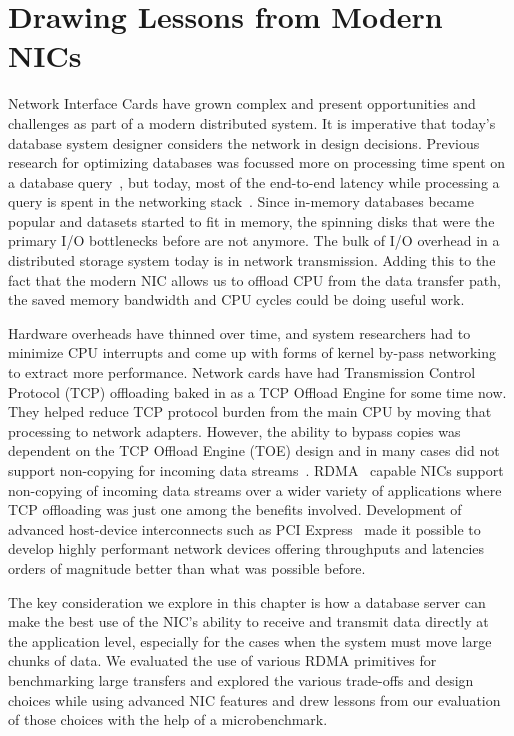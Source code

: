 \chapter{Drawing Lessons from Modern NICs}
\label{chap:modernnics}
Network Interface Cards have grown complex and present opportunities and  challenges as part of a modern distributed system.
 It is imperative that today's database system designer considers the network in design decisions. Previous research for optimizing databases was focussed more on processing time spent on a database query~\cite{dbmsproctime},
  but today, most of the end-to-end latency while processing a query is spent in the  networking stack~\cite{ramcloudosr}.
Since in-memory databases became popular and datasets started to fit in memory, the spinning disks 
that were the primary I/O bottlenecks before are not anymore. The bulk of I/O overhead in a distributed storage system today is in network transmission.
Adding this to the fact that the modern NIC allows us to offload CPU from the data transfer path,
the saved memory bandwidth and CPU cycles could be doing useful work.

Hardware overheads have thinned over time, and system researchers had to minimize CPU interrupts and come up with forms of kernel by-pass networking to extract more performance.
 Network cards have had Transmission Control Protocol (TCP) offloading baked in as a TCP Offload Engine for some time now. They helped reduce TCP protocol burden from the main CPU by moving that processing to network adapters.
 However, the ability to bypass copies was dependent on the TCP Offload Engine (TOE) design and in   many cases did not support non-copying for incoming data streams~\cite{tcpoffload}. 
  RDMA~\cite{rdmapatent,rdmacase,rdma} capable NICs support non-copying of incoming data streams over a wider variety of applications where TCP offloading was just one among the benefits  involved.
 Development of advanced host-device  interconnects such as PCI Express~\cite{pcie}  made it possible to develop highly performant network devices offering throughputs and latencies orders of magnitude better than what was possible before.

 The key consideration we explore in this chapter is how a database server can make the best use of the NIC's ability to receive and transmit data directly at the application level, especially for the
cases when the system must move large chunks of data. We evaluated
the use of various RDMA primitives for benchmarking large transfers and explored the various
 trade-offs and design choices while using advanced NIC features and drew lessons from our evaluation of those choices with the help of a microbenchmark. 


